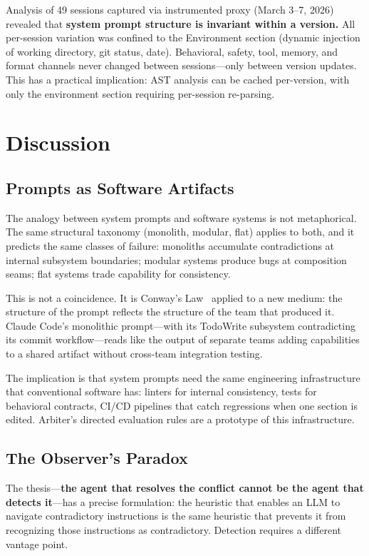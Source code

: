 \documentclass[11pt,a4paper]{article}
\begin{document}
Analysis of 49 sessions captured via instrumented proxy (March 3--7,
2026) revealed that \textbf{system prompt structure is invariant within
a version.} All per-session variation was confined to the Environment
section (dynamic injection of working directory, git status, date).
Behavioral, safety, tool, memory, and format channels never changed
between sessions---only between version updates. This has a practical
implication: AST analysis can be cached per-version, with only the
environment section requiring per-session re-parsing.


\section{Discussion}
\label{sec:discussion}

\subsection{Prompts as Software Artifacts}

The analogy between system prompts and software systems is not
metaphorical. The same structural taxonomy (monolith, modular, flat)
applies to both, and it predicts the same classes of failure:
monoliths accumulate contradictions at internal subsystem boundaries;
modular systems produce bugs at composition seams; flat systems trade
capability for consistency.

This is not a coincidence. It is Conway's
Law~\citep{conway1968committees} applied to a new medium: the structure
of the prompt reflects the structure of the team that produced it.
Claude Code's monolithic prompt---with its TodoWrite subsystem
contradicting its commit workflow---reads like the output of separate
teams adding capabilities to a shared artifact without cross-team
integration testing.

The implication is that system prompts need the same engineering
infrastructure that conventional software has: linters for internal
consistency, tests for behavioral contracts, CI/CD pipelines that
catch regressions when one section is edited. Arbiter's directed
evaluation rules are a prototype of this infrastructure.

\subsection{The Observer's Paradox}

The thesis---\textbf{the agent that resolves the conflict cannot be the
agent that detects it}---has a precise formulation: the heuristic that
enables an LLM to navigate contradictory instructions is the same
heuristic that prevents it from recognizing those instructions as
contradictory. Detection requires a different vantage point.
\end{document}
